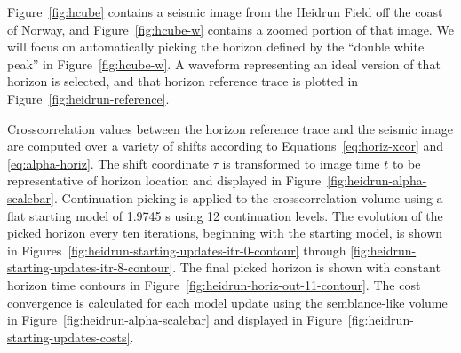 
Figure~\ref{fig:hcube} contains a seismic image from the Heidrun Field off the coast of Norway, and Figure~\ref{fig:hcube-w} contains a zoomed portion of that image.  We will focus on automatically picking the horizon defined by the ``double white peak'' in Figure~\ref{fig:hcube-w}.  A waveform representing an ideal version of that horizon is selected, and that horizon reference trace is plotted in Figure~\ref{fig:heidrun-reference}.


Crosscorrelation values between the horizon reference trace and the seismic image are computed over a variety of shifts according to Equations~\ref{eq:horiz-xcor} and \ref{eq:alpha-horiz}.  The shift coordinate $\tau$ is transformed to image time $t$ to be representative of horizon location and displayed in Figure~\ref{fig:heidrun-alpha-scalebar}.  Continuation picking is applied to the crosscorrelation volume using a flat starting model of 1.9745 s using 12 continuation levels.  The evolution of the picked horizon every ten iterations, beginning with the starting model, is shown in Figures~\ref{fig:heidrun-starting-updates-itr-0-contour} through \ref{fig:heidrun-starting-updates-itr-8-contour}.  The final picked horizon is shown with constant horizon time contours in Figure~\ref{fig:heidrun-horiz-out-11-contour}. The cost convergence is calculated for each model update using the semblance-like volume in Figure~\ref{fig:heidrun-alpha-scalebar} and displayed in Figure~\ref{fig:heidrun-starting-updates-costs}.



